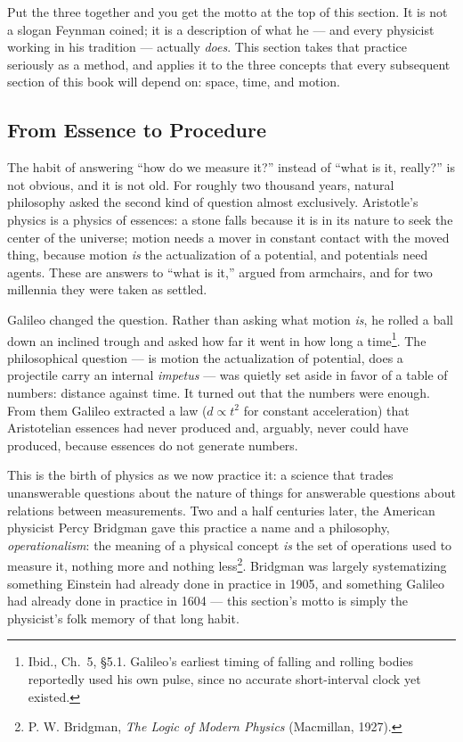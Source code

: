 Put the three together and you get the motto at the top of this section. It is not a slogan Feynman coined; it is a description of what he --- and every physicist working in his tradition --- actually \emph{does}. This section takes that practice seriously as a method, and applies it to the three concepts that every subsequent section of this book will depend on: space, time, and motion.

\subsection{From Essence to Procedure}
\label{sec:operationalism}

The habit of answering ``how do we measure it?'' instead of ``what is it, really?'' is not obvious, and it is not old. For roughly two thousand years, natural philosophy asked the second kind of question almost exclusively. Aristotle's physics is a physics of essences: a stone falls because it is in its nature to seek the center of the universe; motion needs a mover in constant contact with the moved thing, because motion \emph{is} the actualization of a potential, and potentials need agents. These are answers to ``what is it,'' argued from armchairs, and for two millennia they were taken as settled.

Galileo changed the question. Rather than asking what motion \emph{is}, he rolled a ball down an inclined trough and asked how far it went in how long a time\footnote{Ibid., Ch.~5, \S5.1. Galileo's earliest timing of falling and rolling bodies reportedly used his own pulse, since no accurate short-interval clock yet existed.}. The philosophical question --- is motion the actualization of potential, does a projectile carry an internal \emph{impetus} --- was quietly set aside in favor of a table of numbers: distance against time. It turned out that the numbers were enough. From them Galileo extracted a law ($d \propto t^2$ for constant acceleration) that Aristotelian essences had never produced and, arguably, never could have produced, because essences do not generate numbers.

This is the birth of physics as we now practice it: a science that trades unanswerable questions about the nature of things for answerable questions about relations between measurements. Two and a half centuries later, the American physicist Percy Bridgman gave this practice a name and a philosophy, \emph{operationalism}: the meaning of a physical concept \emph{is} the set of operations used to measure it, nothing more and nothing less\footnote{P. W. Bridgman, \emph{The Logic of Modern Physics} (Macmillan, 1927).}. Bridgman was largely systematizing something Einstein had already done in practice in 1905, and something Galileo had already done in practice in 1604 --- this section's motto is simply the physicist's folk memory of that long habit.


